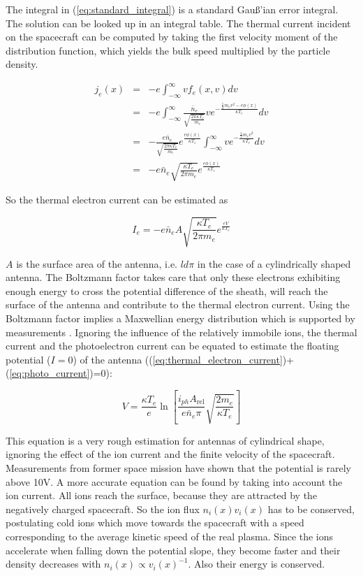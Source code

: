 \documentclass[a4paper,11pt]{thesis}
\begin{document}
The integral in (\ref{eq:standard_integral}) is a standard Gau\ss'ian error integral. The solution can be looked up in an integral table. The thermal current incident on the spacecraft can be computed by taking the first velocity moment of the distribution function, which yields the bulk speed multiplied by the particle density.


\begin{eqnarray}
    j_e(x)&=&-e\int_{-\infty}^\infty v f_e(x,v)dv\\
&=&-e\int_{-\infty}^\infty \frac{\bar{n}_e}{\sqrt{\frac{2 \pi \kappa T_e}{m_e}}}v e^{-\frac{\frac{1}{2}m_e v^2-e\phi(x)}{\kappa T_e}}dv\\
&=&-\frac{e \bar{n}_e}{\sqrt{\frac{2 \pi \kappa T_e}{m_e}}} e^{\frac{e\phi(x)}{\kappa T_e}} \int_{-\infty}^\infty v e^{-\frac{\frac{1}{2}m_e v^2}{\kappa T_e}}dv\\
&=&-e \bar{n}_e \sqrt{\frac{\kappa T_e}{2\pi m_e}} e^{\frac{e\phi(x)}{\kappa T_e}}
\end{eqnarray}

So the thermal electron current can be estimated as

\begin{equation}\label{eq:thermal_electron_current}
I_e=-e\bar{n}_e A \sqrt{\frac{\kappa T_e}{2\pi m_e}}e^{\frac{eV}{\kappa T_e}}
\end{equation}

$A$ is the surface area of the antenna, i.e. $ld\pi$ in the case of a cylindrically shaped antenna. The Boltzmann factor takes care that only these electrons exhibiting enough energy to cross the potential difference of the sheath, will reach the surface of the antenna and contribute to the thermal electron current. Using the Boltzmann factor implies a Maxwellian energy distribution which is supported by measurements \cite{grard73}. Ignoring the influence of the relatively immobile ions, the thermal current and the photoelectron current can be equated to estimate the floating potential ($I=0$) of the antenna ((\ref{eq:thermal_electron_current})+(\ref{eq:photo_current})=0):

\begin{equation}
V=\frac{\kappa T_e}{e} \ln\left[\frac{i_{ph} A_{\textrm{rel}}}{e\bar{n}_e  \pi} \sqrt{\frac{2 m_e}{\kappa T_e}}\right]
\end{equation}

This equation is a very rough estimation for antennas of cylindrical shape, ignoring the effect of the ion current and the finite velocity of the spacecraft. Measurements from former space mission have shown that the potential is rarely above 10V. A more accurate equation can be found by taking into account the ion current. All ions reach the surface, because they are attracted by the negatively charged spacecraft. So the ion flux $n_i(x)v_i(x)$ has to be conserved, postulating cold ions which move towards the spacecraft with a speed corresponding to the average kinetic speed of the real plasma. Since the ions accelerate when falling down the potential slope, they become faster and their density decreases with $n_i(x)\propto v_i(x)^{-1}$. Also their energy is conserved.
\end{document}
